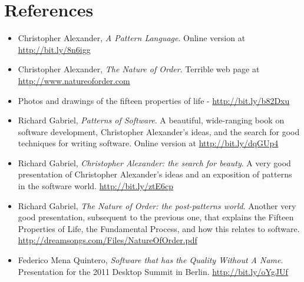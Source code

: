 \section*{References}
\begin{itemize}
 \item Christopher Alexander, \textit{A Pattern Language}. Online version at
\url{http://bit.ly/8n6igg}
 \item Christopher Alexander, \textit{The Nature of Order}. Terrible web page at
\url{http://www.natureoforder.com}
 \item Photos and drawings of the fifteen properties of life -
\url{http://bit.ly/b82Dxu}
 \item Richard Gabriel, \textit{Patterns of Software}. A beautiful, wide-ranging
book on software development, Christopher Alexander's ideas, and the search for
good techniques for writing software. Online version at
\url{http://bit.ly/dqGUp4}
 \item Richard Gabriel, \textit{Christopher Alexander: the search for beauty}. A
very good presentation of Christopher Alexander's ideas and an exposition of
patterns in the software world.
\url{http://bit.ly/ztE6cp}
 \item Richard Gabriel, \textit{The Nature of Order: the post-patterns world}.
Another very good presentation, subsequent to the previous one, that explains
the Fifteen Properties of Life, the Fundamental Process, and how this relates to
software. \url{http://dreamsongs.com/Files/NatureOfOrder.pdf}
 \item Federico Mena Quintero, \textit{Software that has the Quality
   Without A Name}.  Presentation for the 2011 Desktop Summit in
   Berlin.  \url{http://bit.ly/oYgJUf}
\end{itemize}

